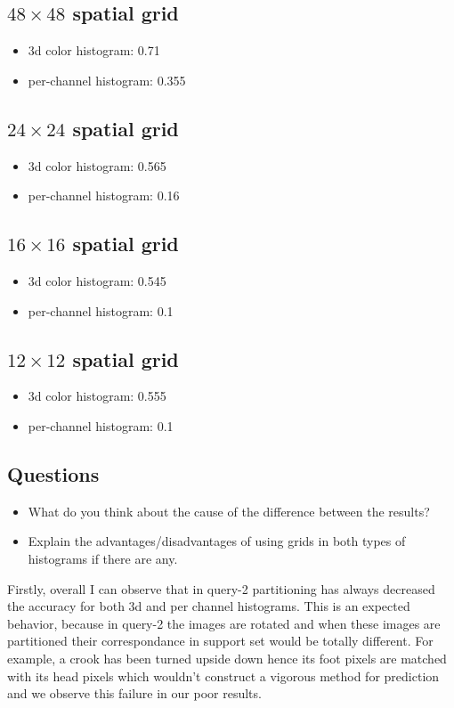 \documentclass[12pt]{article}
\begin{document}
\subsection{$48\times48$ spatial grid}
\begin{itemize}
\item 3d color histogram: 0.71
\item per-channel histogram: 0.355
\end{itemize}

\subsection{$24\times24$ spatial grid}
\begin{itemize}
\item 3d color histogram: 0.565
\item per-channel histogram: 0.16
\end{itemize}

\subsection{$16\times16$ spatial grid}
\begin{itemize}
\item 3d color histogram: 0.545
\item per-channel histogram: 0.1
\end{itemize}

\subsection{$12\times12$ spatial grid}
\begin{itemize}
\item 3d color histogram: 0.555
\item per-channel histogram: 0.1
\end{itemize}

\subsection{Questions}
\begin{itemize}
\item What do you think about the cause of the difference between the results?
\item Explain the advantages/disadvantages of using grids in both types of histograms if there are any.
\end{itemize}

Firstly, overall I can observe that in query-2 partitioning has always decreased the accuracy 
for both 3d and per channel histograms. This is an expected behavior, because in query-2
the images are rotated and when these images are partitioned their correspondance
in support set would be totally different. For example, a crook has been turned upside down
hence its foot pixels are matched with its head pixels which wouldn't construct a vigorous
method for prediction and we observe this failure in our poor results.
\end{document}
